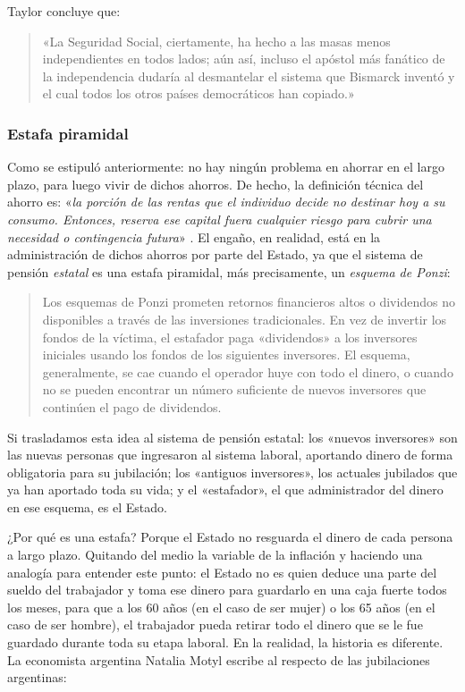 \documentclass[12pt,a4paper,twoside]{book}
\begin{document}
Taylor concluye que:

\begin{quotation}
«La Seguridad Social, ciertamente, ha hecho a las masas menos independientes en todos lados; aún así, incluso el apóstol más fanático de la independencia dudaría al desmantelar el sistema que Bismarck inventó y el cual todos los otros países democráticos han copiado.» \cite[págs. 35-36]{palmer:jubilacion}
\end{quotation}

\subsubsection{Estafa piramidal}
Como se estipuló anteriormente: no hay ningún problema en ahorrar en el largo plazo, para luego vivir de dichos ahorros. De hecho, la definición técnica del ahorro es: «\textit{la porción de las rentas que el individuo decide no destinar hoy a su consumo. Entonces, reserva ese capital fuera cualquier riesgo para cubrir una necesidad o contingencia futura}» \cite{epedia:ahorro}. El engaño, en realidad, está en la administración de dichos ahorros por parte del Estado, ya que el sistema de pensión \textit{estatal} es una estafa piramidal, más precisamente, un \textit{esquema de Ponzi}:

\begin{quotation}
Los esquemas de Ponzi prometen retornos financieros altos o dividendos no disponibles a través de las inversiones tradicionales. En vez de invertir los fondos de la víctima, el estafador paga «dividendos» a los inversores iniciales usando los fondos de los siguientes inversores. El esquema, generalmente, se cae cuando el operador huye con todo el dinero, o cuando no se pueden encontrar un número suficiente de nuevos inversores que continúen el pago de dividendos. \cite{esquemaponzi}
\end{quotation}

Si trasladamos esta idea al sistema de pensión estatal: los «nuevos inversores» son las nuevas personas que ingresaron al sistema laboral, aportando dinero de forma obligatoria para su jubilación; los «antiguos inversores», los actuales jubilados que ya han aportado toda su vida; y el «estafador», el que administrador del dinero en ese esquema, es el Estado.

¿Por qué es una estafa? Porque el Estado no resguarda el dinero de cada persona a largo plazo. Quitando del medio la variable de la inflación y haciendo una analogía para entender este punto: el Estado no es quien deduce una parte del sueldo del trabajador y toma ese dinero para guardarlo en una caja fuerte todos los meses, para que a los 60 años (en el caso de ser mujer) o los 65 años (en el caso de ser hombre), el trabajador pueda retirar todo el dinero que se le fue guardado durante toda su etapa laboral. En la realidad, la historia es diferente. La economista argentina Natalia Motyl escribe al respecto de las jubilaciones argentinas:
\end{document}
